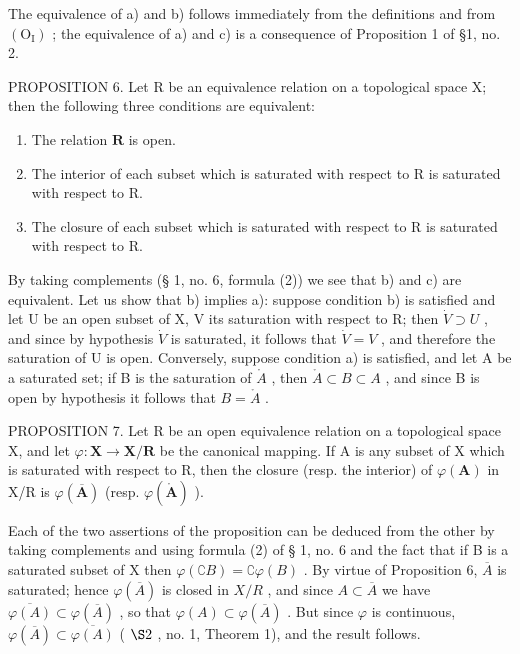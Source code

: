 The equivalence of a) and b) follows immediately from the definitions and from \((\mathrm{O}_{\mathrm{I}})\) ; the equivalence of a) and c) is a consequence of Proposition 1 of §1, no. 2.

PROPOSITION 6. Let R be an equivalence relation on a topological space X; then the following three conditions are equivalent:

\begin{enumerate}
\def\labelenumi{\alph{enumi})}
\item
  The relation \(\mathbf{R}\) is open.
\item
  The interior of each subset which is saturated with respect to R is saturated with respect to R.
\item
  The closure of each subset which is saturated with respect to R is saturated with respect to R.
\end{enumerate}

By taking complements (§ 1, no. 6, formula (2)) we see that b) and c) are equivalent. Let us show that b) implies a): suppose condition b) is satisfied and let U be an open subset of X, V its saturation with respect to R; then \(\dot{V} \supset U\) , and since by hypothesis \(\dot{V}\) is saturated, it follows that \(\dot{V} = V\) , and therefore the saturation of U is open. Conversely, suppose condition a) is satisfied, and let A be a saturated set; if B is the saturation of \(\mathring{A}\) , then \(\mathring{A} \subset B \subset A\) , and since B is open by hypothesis it follows that \(B = \mathring{A}\) .

PROPOSITION 7. Let R be an open equivalence relation on a topological space X, and let \(\varphi: \mathbf{X} \to \mathbf{X}/\mathbf{R}\) be the canonical mapping. If A is any subset of X which is saturated with respect to R, then the closure (resp. the interior) of \(\varphi(\mathbf{A})\) in X/R is \(\varphi(\overline{\mathbf{A}})\) (resp. \(\varphi(\mathring{\mathbf{A}})\) ).

Each of the two assertions of the proposition can be deduced from the other by taking complements and using formula (2) of § 1, no. 6 and the fact that if B is a saturated subset of X then \(\varphi(\complement B) = \complement \varphi(B)\) . By virtue of Proposition 6, \(\overline{A}\) is saturated; hence \(\varphi(\overline{A})\) is closed in \(X/R\) , and since \(A \subset \overline{A}\) we have \(\overline{\varphi(A)} \subset \varphi(\overline{A})\) , so that \(\varphi(A) \subset \varphi(\overline{A})\) . But since \(\varphi\) is continuous, \(\varphi(\overline{A}) \subset \overline{\varphi(A)}\) ( \(\S 2\) , no. 1, Theorem 1), and the result follows.

